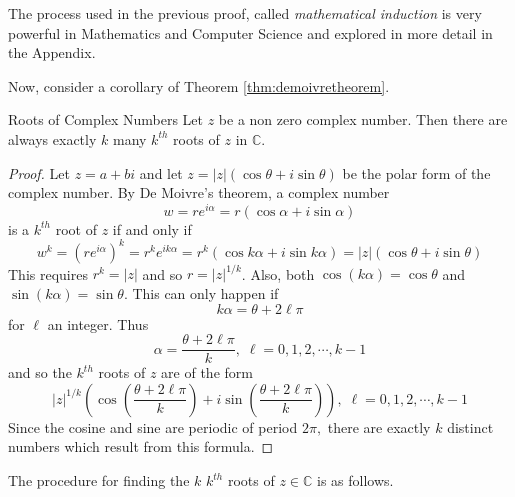 The process used in the previous proof, called {\em mathematical
induction\em} is very powerful in Mathematics and Computer Science
and explored in more detail in the Appendix.

Now, consider a corollary of Theorem \ref{thm:demoivretheorem}.

\begin{corollary}{Roots of Complex Numbers}\label{cor:rootscomplexnumbers}
Let $z$ be a non zero complex number.
Then there are always exactly $k$ many  $k^{th}$
roots of $z$ in $\mathbb{C}$.
\end{corollary}

\begin{proof}
Let $z=a+bi$ and let $z=\left\vert z\right\vert \left( \cos
\theta+i\sin \theta\right) $ be the polar form of the complex number. By De Moivre's
theorem, a complex number
\begin{equation*}
w= r e^{i \alpha} = r\left( \cos \alpha +i\sin \alpha \right) 
\end{equation*}
is a $k^{th}$ root of $z$ if and only if
\begin{equation*}
w^k = (r e^{i \alpha})^k = r^k e^{ik\alpha} = r^{k}\left( \cos k\alpha +i\sin k\alpha \right) =\left\vert z\right\vert
\left( \cos \theta+i\sin \theta\right) 
\end{equation*}
This requires $r^{k}=\left\vert z\right\vert $ and so $r=\left\vert
z\right\vert ^{1/k}$. Also, both $\cos \left( k\alpha \right) =\cos \theta$ and
$\sin \left( k\alpha \right) =\sin \theta.$ This can only happen if
\begin{equation*}
k\alpha =\theta+2 \ell \pi
\end{equation*}
for $\ell$ an integer. Thus
\begin{equation*}
\alpha =
\frac{\theta+2 \ell \pi }{k},\; \ell = 0, 1, 2, \cdots, k-1 
\end{equation*}
and so the $k^{th}$ roots of $z$ are of the form
\begin{equation*}
\left\vert z\right\vert ^{1/k}\left( \cos \left( \frac{\theta+2 \ell \pi }{k}\right)
+i\sin \left( \frac{\theta+2 \ell \pi }{k}\right) \right) ,\;\ell = 0, 1, 2, \cdots, k-1 
\end{equation*}
Since the cosine and sine are periodic of period $2\pi ,$ there are exactly $
k$ distinct numbers which result from this formula. 
\end{proof}

The procedure for finding the $k$ $k^{th}$ roots of $z \in \mathbb{C}$ is as follows.

